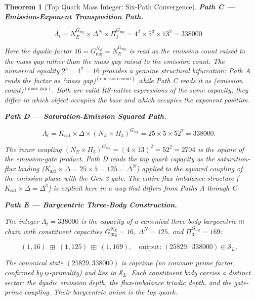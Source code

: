 \documentclass[11pt, letterpaper]{article}
\newcommand{\koppa}{\mathbin{\text{\rm\k{o}}}}
\theoremstyle{definition}
\theoremstyle{plain}
\newtheorem{theorem}{Theorem}[section]
\begin{document}
\begin{theorem}[Top Quark Mass Integer: Six-Path Convergence]
\medskip
\noindent\textbf{Path C — Emission-Exponent Transposition Path.}

\begin{equation}
    \Lambda_t = N_E^{G_\mathrm{mg}} \times \Delta^N \times \Pi_3^{G_\mathrm{mg}}
              = 4^2 \times 5^3 \times 13^2 = 338000.
\end{equation}

Here the dyadic factor $16 = G_\mathrm{mg}^{N_E} = N_E^{G_\mathrm{mg}}$ is read as the
emission count raised to the mass gap rather than the mass gap raised to the emission
count. The numerical equality $2^4 = 4^2 = 16$ provides a genuine structural bifurcation:
Path A reads the factor as (mass gap)$^{(\text{emission count})}$ while Path C reads
it as (emission count)$^{(\text{mass gap})}$. Both are valid RS-native expressions of
the same capacity; they differ in which object occupies the base and which occupies the
exponent position.

\medskip
\noindent\textbf{Path D — Saturation-Emission Squared Path.}

\begin{equation}
    \Lambda_t = K_\mathrm{sat} \times \Delta \times (N_E \times \Pi_3)^{G_\mathrm{mg}}
              = 25 \times 5 \times 52^2 = 338000.
\end{equation}

The inner coupling $(N_E \times \Pi_3)^{G_\mathrm{mg}} = (4 \times 13)^2 = 52^2 = 2704$
is the square of the emission-gate product. Path D reads the top quark capacity as the
saturation-flux loading ($K_\mathrm{sat} \times \Delta = 25 \times 5 = 125 = \Delta^N$)
applied to the squared coupling of the emission phase with the Gen-3 gate.
The entire flux imbalance structure ($K_\mathrm{sat} \times \Delta = \Delta^3$) is
explicit here in a way that differs from Paths A through C.

\medskip
\noindent\textbf{Path E — Barycentric Three-Body Construction.}

The integer $\Lambda_t = 338000$ is the capacity of a canonical three-body barycentric
$\boxplus$-chain with constituent capacities
$G_\mathrm{mg}^{N_E} = 16$, $\Delta^N = 125$, and $\Pi_3^{G_\mathrm{mg}} = 169$:

\begin{equation}
    (1, 16) \;\boxplus\; (1, 125) \;\boxplus\; (1, 169),
    \quad \text{output: } (25829,\; 338000) \in \mathcal{S}_L.
\end{equation}

The canonical state $(25829, 338000)$ is coprime (no common prime factor, confirmed by $\koppa$-primality) and lies in
$\mathcal{S}_L$. Each constituent body carries a distinct sector: the dyadic emission
depth, the flux-imbalance triadic depth, and the gate-prime coupling. Their barycentric
union is the top quark.


\end{theorem}
\end{document}
